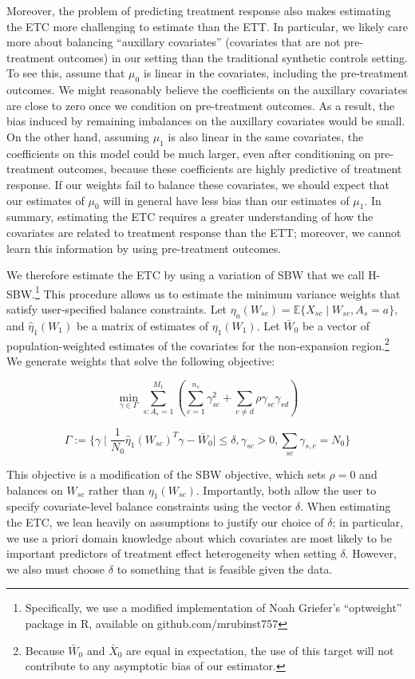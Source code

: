 \documentclass{article}
\begin{document}
Moreover, the problem of predicting treatment response also makes estimating the ETC more challenging to estimate than the ETT. In particular, we likely care more about balancing ``auxillary covariates'' (covariates that are not pre-treatment outcomes) in our setting than the traditional synthetic controls setting. To see this, assume that $\mu_0$ is linear in the covariates, including the pre-treatment outcomes. We might reasonably believe the coefficients on the auxillary covariates are close to zero once we condition on pre-treatment outcomes. As a result, the bias induced by remaining imbalances on the auxillary covariates would be small. On the other hand, assuming $\mu_1$ is also linear in the same covariates, the coefficients on this model could be much larger, even after conditioning on pre-treatment outcomes, because these coefficients are highly predictive of treatment response. If our weights fail to balance these covariates, we should expect that our estimates of $\mu_0$ will in general have less bias than our estimates of $\mu_1$. In summary, estimating the ETC requires a greater understanding of how the covariates are related to treatment response than the ETT; moreover, we cannot learn this information by using pre-treatment outcomes.

We therefore estimate the ETC by using a variation of SBW that we call H-SBW.\footnote{Specifically, we use a modified implementation of Noah Griefer's ``optweight'' package in R, available on github.com/mrubinst757} This procedure allows us to estimate the minimum variance weights that satisfy user-specified balance constraints. Let $\eta_a(W_{sc}) = \mathbb{E}\{X_{sc} \mid W_{sc}, A_s = a\}$, and $\hat{\eta}_1(W_1)$ be a matrix of estimates of $\eta_1(W_1)$. Let $\bar{W}_0$ be a vector of population-weighted estimates of the covariates for the non-expansion region.\footnote{Because $\bar{W}_0$ and $\bar{X}_0$ are equal in expectation, the use of this target will not contribute to any asymptotic bias of our estimator.} We generate weights that solve the following objective:

$$
\min_{\gamma \in \Gamma} \sum_{s: A_s = 1}^{M_1}(\sum_{c = 1}^{n_s} \gamma_{sc}^2 + \sum_{c \ne d}\rho \gamma_{sc}\gamma_{sd})
$$

$$
\Gamma := \{\gamma \mid \frac{1}{N_0}\hat{\eta}_1(W_{sc})^T\gamma - \bar{W}_0 \mid \le \delta, \gamma_{sc} > 0, \sum_{sc}\gamma_{s,c} = N_0\}
$$

This objective is a modification of the SBW objective, which sets $\rho = 0$ and balances on $W_{sc}$ rather than $\eta_1(W_{sc})$. Importantly, both allow the user to specify covariate-level balance constraints using the vector $\delta$. When estimating the ETC, we lean heavily on assumptions to justify our choice of $\delta$; in particular, we use a priori domain knowledge about which covariates are most likely to be important predictors of treatment effect heterogeneity when setting $\delta$. However, we also must choose $\delta$ to something that is feasible given the data. 
\end{document}
